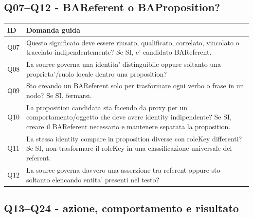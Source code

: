 \documentclass[11pt,a4paper]{article}
\begin{document}
\subsection{Q07--Q12 - BAReferent o BAProposition?}

\begin{longtable}{L{17mm}L{122mm}}
\toprule
\textbf{ID} & \textbf{Domanda guida} \\
\midrule\endhead
Q07 & Questo significato deve essere riusato, qualificato, correlato, vincolato o tracciato indipendentemente? Se SI, e' candidato BAReferent. \\
Q08 & La source governa una identita' distinguibile oppure soltanto una proprieta'/ruolo locale dentro una proposition? \\
Q09 & Sto creando un BAReferent solo per trasformare ogni verbo o frase in un nodo? Se SI, fermarsi. \\
Q10 & La proposition candidata sta facendo da proxy per un comportamento/oggetto che deve avere identity indipendente? Se SI, creare il BAReferent necessario e mantenere separata la proposition. \\
Q11 & La stessa identity compare in proposition diverse con roleKey differenti? Se SI, non trasformare il roleKey in una classificazione universale del referent. \\
Q12 & La source governa davvero una asserzione tra referent oppure sto soltanto elencando entita' presenti nel testo? \\
\bottomrule
\end{longtable}

\subsection{Q13--Q24 - azione, comportamento e risultato}
\end{document}
